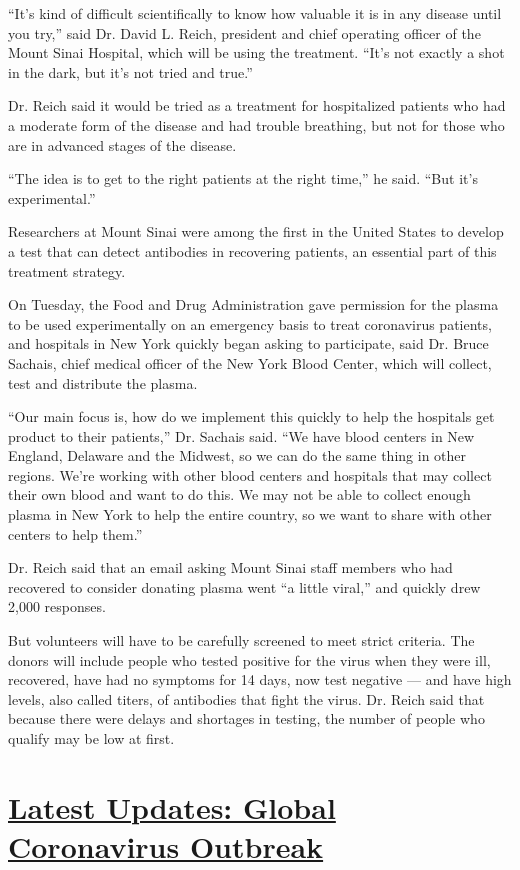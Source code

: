 ``It's kind of difficult scientifically to know how valuable it is in
any disease until you try,'' said Dr. David L. Reich, president and
chief operating officer of the Mount Sinai Hospital, which will be using
the treatment. ``It's not exactly a shot in the dark, but it's not tried
and true.''

Dr. Reich said it would be tried as a treatment for hospitalized
patients who had a moderate form of the disease and had trouble
breathing, but not for those who are in advanced stages of the disease.

``The idea is to get to the right patients at the right time,'' he said.
``But it's experimental.''

Researchers at Mount Sinai were among the first in the United States to
develop a test that can detect antibodies in recovering patients, an
essential part of this treatment strategy.

On Tuesday, the Food and Drug Administration gave permission for the
plasma to be used experimentally on an emergency basis to treat
coronavirus patients, and hospitals in New York quickly began asking to
participate, said Dr. Bruce Sachais, chief medical officer of the New
York Blood Center, which will collect, test and distribute the plasma.

``Our main focus is, how do we implement this quickly to help the
hospitals get product to their patients,'' Dr. Sachais said. ``We have
blood centers in New England, Delaware and the Midwest, so we can do the
same thing in other regions. We're working with other blood centers and
hospitals that may collect their own blood and want to do this. We may
not be able to collect enough plasma in New York to help the entire
country, so we want to share with other centers to help them.''

Dr. Reich said that an email asking Mount Sinai staff members who had
recovered to consider donating plasma went ``a little viral,'' and
quickly drew 2,000 responses.

But volunteers will have to be carefully screened to meet strict
criteria. The donors will include people who tested positive for the
virus when they were ill, recovered, have had no symptoms for 14 days,
now test negative --- and have high levels, also called titers, of
antibodies that fight the virus. Dr. Reich said that because there were
delays and shortages in testing, the number of people who qualify may be
low at first.

\hypertarget{latest-updates-global-coronavirus-outbreak}{%
\section{\texorpdfstring{\href{https://www.nytimes3xbfgragh.onion/2020/08/04/world/coronavirus-cases.html?action=click\&pgtype=Article\&state=default\&region=MAIN_CONTENT_1\&context=storylines_live_updates}{Latest
Updates: Global Coronavirus
Outbreak}}{Latest Updates: Global Coronavirus Outbreak}}\label{latest-updates-global-coronavirus-outbreak}}

